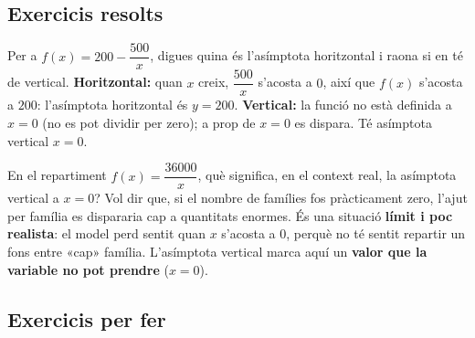 \subsection{Exercicis resolts}

\begin{exresolt}
Per a $f(x)=200-\dfrac{500}{x}$, digues quina és l'asímptota horitzontal i raona si en
té de vertical.
\solucio
\textbf{Horitzontal:} quan $x$ creix, $\dfrac{500}{x}$ s'acosta a $0$, així que $f(x)$
s'acosta a $200$: l'asímptota horitzontal és $y=200$. \textbf{Vertical:} la funció no
està definida a $x=0$ (no es pot dividir per zero); a prop de $x=0$ es dispara. Té
asímptota vertical $x=0$.
\end{exresolt}

\begin{exresolt}
En el repartiment $f(x)=\dfrac{\num{36000}}{x}$, què significa, en el context real, la
asímptota vertical a $x=0$?
\solucio
Vol dir que, si el nombre de famílies fos pràcticament zero, l'ajut per família es
dispararia cap a quantitats enormes. És una situació \textbf{límit i poc realista}: el
model perd sentit quan $x$ s'acosta a $0$, perquè no té sentit repartir un fons entre
«cap» família. L'asímptota vertical marca aquí un \textbf{valor que la variable no pot
prendre} ($x=0$).
\end{exresolt}

\subsection{Exercicis per fer}

